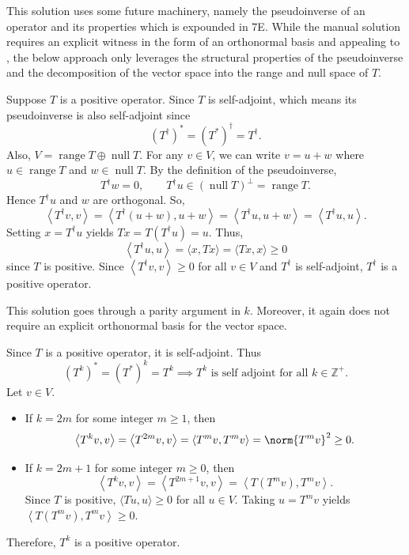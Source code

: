 
This solution uses some future machinery, namely the pseudoinverse of an operator and its properties which is expounded in 7E.
While the manual solution requires an explicit witness in the form of an orthonormal basis and appealing to , the below approach only leverages the structural properties of the pseudoinverse and the decomposition of the vector space into the range and null space of $T$.

\begin{csp}
    Suppose $T$ is a positive operator. Since $T$ is self-adjoint, which means its pseudoinverse is also self-adjoint since
    $$\left(T^{\dagger}\right)^{\ast}=\left(T^{\ast}\right)^{\dagger}=T^{\dagger}.$$
    Also, $V=\operatorname{range} T \oplus \operatorname{null} T$. For any $v \in V$, we can write $v=u+w$ where $u \in \operatorname{range} T$ and $w \in \operatorname{null} T$. By the definition of the pseudoinverse,
    $$T^{\dagger} w=0, \qquad T^{\dagger} u \in (\operatorname{null} T)^{\perp}=\operatorname{range} T.$$
    Hence $T^{\dagger} u$ and $w$ are orthogonal. So,
    $$\left \langle T^{\dagger} v,v \right \rangle=\left \langle T^{\dagger}(u+w), u+w \right \rangle=\left \langle T^{\dagger}u, u+w \right \rangle=\left \langle T^{\dagger} u, u \right \rangle.$$
    Setting $x=T^{\dagger}u$ yields $Tx=T\left(T^{\dagger}u\right)=u$. Thus,
    $$\left \langle T^{\dagger} u,u \right \rangle=\langle x,Tx \rangle=\langle Tx,x \rangle \geq 0$$
    since $T$ is positive. Since $\left \langle T^{\dagger}v,v \right \rangle \geq 0$ for all $v \in V$ and $T^{\dagger}$ is self-adjoint, $T^{\dagger}$ is a positive operator.
\end{csp}


This solution goes through a parity argument in $k$.
Moreover, it again does not require an explicit orthonormal basis for the vector space.

\begin{csp}
    Since $T$ is a positive operator, it is self-adjoint. Thus
    $$\left(T^k\right)^{\ast}=\left(T^{\ast}\right)^k=T^k \implies T^k \text{ is self adjoint for all } k \in \mathbb{Z}^{+}.$$
    Let $v \in V$.
    \begin{itemize}
    \item If $k=2m$ for some integer $m \geq 1$, then
    $$\left \langle T^k v,v \right \rangle=\left \langle T^{2m} v, v \right \rangle=\left \langle T^m v, T^m v \right \rangle=\norm{T^m v}^2 \geq 0.$$
    \item If $k=2m+1$ for some integer $m \geq 0$, then
    $$\left \langle T^k v, v \right \rangle=\left \langle T^{2m+1}v, v \right \rangle=\left \langle T\left(T^m v \right), T^m v \right \rangle.$$
    Since $T$ is positive, $\langle Tu,u \rangle \geq 0$ for all $u \in V$. Taking $u=T^m v$ yields $\left \langle T\left(T^m v \right), T^m v \right \rangle \geq 0$.
    \end{itemize}
    Therefore, $T^k$ is a positive operator.
\end{csp}

